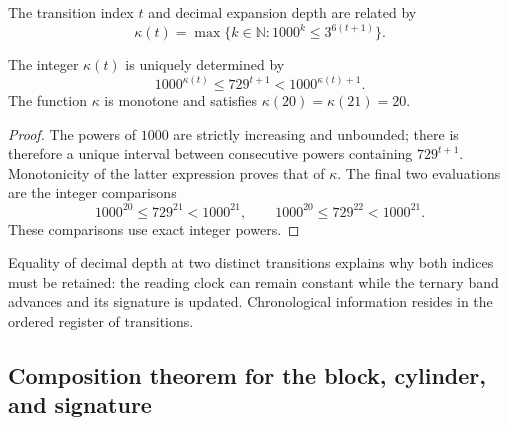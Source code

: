 \begin{definition}
The transition index \(t\) and decimal expansion depth are related by
\begin{equation}
 \kappa(t)=\max\{k\in\mathbb N:1000^k\leq3^{6(t+1)}\}.
 \label{act21:eq:df-reloj}
\end{equation}
\end{definition}

\begin{proposition}
\label{act21:prop:df-reloj}
The integer \(\kappa(t)\) is uniquely determined by
\begin{equation}
 1000^{\kappa(t)}\leq729^{t+1}<1000^{\kappa(t)+1}.
 \label{act21:eq:df-reloj-cotas}
\end{equation}
The function \(\kappa\) is monotone and satisfies
\(\kappa(20)=\kappa(21)=20\).
\end{proposition}

\begin{proof}
The powers of \(1000\) are strictly increasing and unbounded; there is
therefore a unique interval between consecutive powers containing
\(729^{t+1}\). Monotonicity of the latter expression proves that of
\(\kappa\). The final two evaluations are the integer comparisons
\[
 1000^{20}\leq729^{21}<1000^{21},\qquad
 1000^{20}\leq729^{22}<1000^{21}.
\]
These comparisons use exact integer powers.
\end{proof}

Equality of decimal depth at two distinct transitions explains why both
indices must be retained: the reading clock can remain constant while
the ternary band advances and its signature is updated. Chronological
information resides in the ordered register of transitions.

\subsection{Composition theorem for the block, cylinder, and signature}

